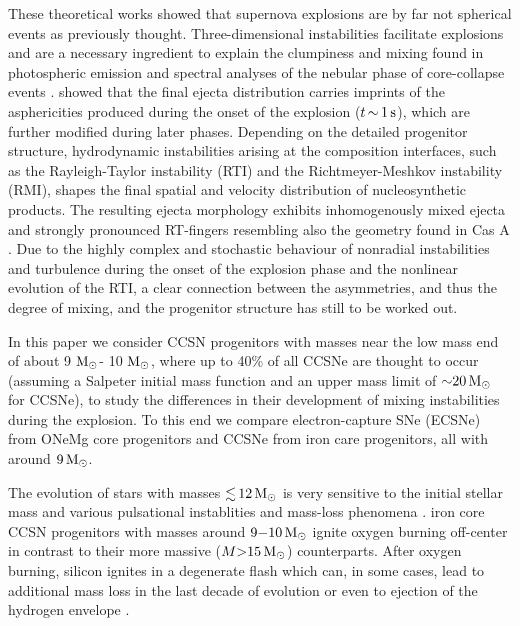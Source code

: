\documentclass[fleqn,usenatbib]{mnras}
\newcommand{\solm}{\ensuremath{\rm{M_{\odot}}}\xspace}
\begin{document}
These theoretical works showed that supernova explosions are by far 
not spherical events as previously thought. Three-dimensional 
instabilities facilitate explosions 
\citep{Herant1994a,Burrows1995,Janka1996,Melson2015a,Mueller2017} 
and are a necessary ingredient to explain the clumpiness and 
mixing found in photospheric emission \citep{Utrobin2015,Utrobin2017} 
and spectral analyses of the nebular phase of core-collapse events \citep{Jerkstrand2017}. 
\citet{Wongwathanarat2015} showed that the final ejecta 
distribution carries imprints of the 
asphericities produced during the onset of the explosion 
($t\,\mathord{\sim}\, 1\, \rm s$), which are further modified during 
later phases. Depending on the detailed progenitor structure, hydrodynamic 
instabilities arising at the composition interfaces, such as the Rayleigh-Taylor 
instability (RTI) and the Richtmeyer-Meshkov instability (RMI), shapes 
the final spatial and velocity distribution of nucleosynthetic products. 
The resulting ejecta morphology exhibits inhomogenously mixed ejecta and 
strongly pronounced RT-fingers resembling also the geometry found in Cas A 
\citep{Wongwathanarat2017,Grefenstette2017}. Due to the highly complex and 
stochastic behaviour of nonradial instabilities and turbulence during the 
onset of the explosion phase and the nonlinear evolution of the RTI, a clear 
connection between the asymmetries, and thus the degree of mixing, and 
the progenitor structure has still to be worked out.

In this paper we consider CCSN progenitors with masses near the low 
mass end of about 9 \solm - 10 \solm, where up to 40\% of all CCSNe 
are thought to occur (assuming a Salpeter initial mass function  
\citep{Salpeter1955} and an upper mass limit of $\mathord{\sim}20\,\solm$ 
for CCSNe), to study the differences in their development of mixing 
instabilities during the explosion. To this end we compare 
electron-capture SNe (ECSNe) from ONeMg core progenitors and 
CCSNe from iron care progenitors, all with around $9\,\solm$. 

The evolution of stars with masses $\mathord{\lesssim}\,12\, \solm$ 
is very sensitive to the initial stellar mass and various 
pulsational instablities and mass-loss phenomena \citep{Woosley2015}.
iron core CCSN progenitors with masses around $9\mathord{-}10\,\solm$ 
ignite oxygen burning off-center in contrast to their more massive 
($M \mathord{>} 15\, \solm$) counterparts. After oxygen burning, silicon 
ignites in a degenerate flash which can, in some cases, lead to 
additional mass loss in the last decade of evolution or even to 
ejection of the hydrogen envelope \citet{Woosley2015}.
\end{document}
